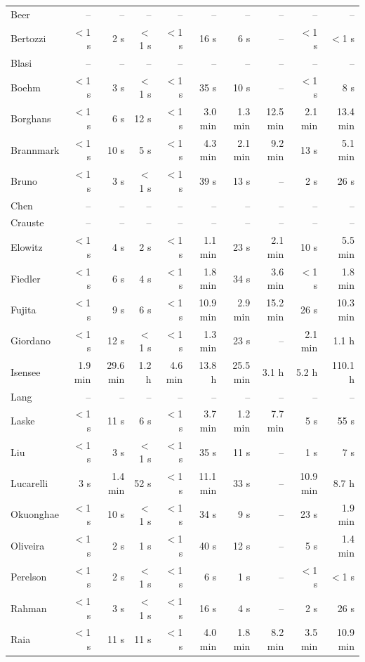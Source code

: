 \begin{longtable}{@{}lrrrrrrrrr@{}}
Beer & -- & -- & -- & -- & -- & -- & -- & -- & -- \\
Bertozzi & $<$1 s & 2 s & $<$1 s & $<$1 s & 16 s & 6 s & -- & $<$1 s & $<$1 s \\
Blasi & -- & -- & -- & -- & -- & -- & -- & -- & -- \\
Boehm & $<$1 s & 3 s & $<$1 s & $<$1 s & 35 s & 10 s & -- & $<$1 s & 8 s \\
Borghans & $<$1 s & 6 s & 12 s & $<$1 s & 3.0 min & 1.3 min & 12.5 min & 2.1 min & 13.4 min \\
Brannmark & $<$1 s & 10 s & 5 s & $<$1 s & 4.3 min & 2.1 min & 9.2 min & 13 s & 5.1 min \\
Bruno & $<$1 s & 3 s & $<$1 s & $<$1 s & 39 s & 13 s & -- & 2 s & 26 s \\
Chen & -- & -- & -- & -- & -- & -- & -- & -- & -- \\
Crauste & -- & -- & -- & -- & -- & -- & -- & -- & -- \\
Elowitz & $<$1 s & 4 s & 2 s & $<$1 s & 1.1 min & 23 s & 2.1 min & 10 s & 5.5 min \\
Fiedler & $<$1 s & 6 s & 4 s & $<$1 s & 1.8 min & 34 s & 3.6 min & $<$1 s & 1.8 min \\
Fujita & $<$1 s & 9 s & 6 s & $<$1 s & 10.9 min & 2.9 min & 15.2 min & 26 s & 10.3 min \\
Giordano & $<$1 s & 12 s & $<$1 s & $<$1 s & 1.3 min & 23 s & -- & 2.1 min & 1.1 h \\
Isensee & 1.9 min & 29.6 min & 1.2 h & 4.6 min & 13.8 h & 25.5 min & 3.1 h & 5.2 h & 110.1 h \\
Lang & -- & -- & -- & -- & -- & -- & -- & -- & -- \\
Laske & $<$1 s & 11 s & 6 s & $<$1 s & 3.7 min & 1.2 min & 7.7 min & 5 s & 55 s \\
Liu & $<$1 s & 3 s & $<$1 s & $<$1 s & 35 s & 11 s & -- & 1 s & 7 s \\
Lucarelli & 3 s & 1.4 min & 52 s & $<$1 s & 11.1 min & 33 s & -- & 10.9 min & 8.7 h \\
Okuonghae & $<$1 s & 10 s & $<$1 s & $<$1 s & 34 s & 9 s & -- & 23 s & 1.9 min \\
Oliveira & $<$1 s & 2 s & 1 s & $<$1 s & 40 s & 12 s & -- & 5 s & 1.4 min \\
Perelson & $<$1 s & 2 s & $<$1 s & $<$1 s & 6 s & 1 s & -- & $<$1 s & $<$1 s \\
Rahman & $<$1 s & 3 s & $<$1 s & $<$1 s & 16 s & 4 s & -- & 2 s & 26 s \\
Raia & $<$1 s & 11 s & 11 s & $<$1 s & 4.0 min & 1.8 min & 8.2 min & 3.5 min & 10.9 min \\

\end{longtable}
